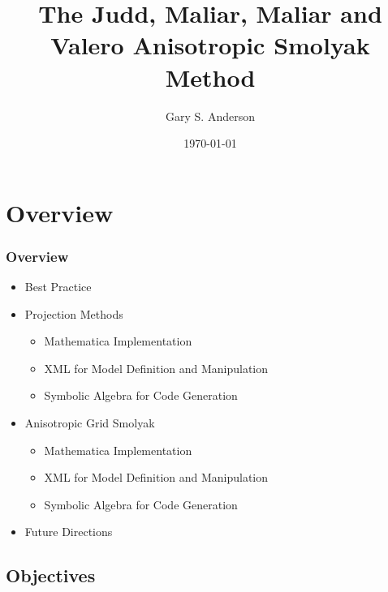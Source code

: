 \documentclass[handout]{beamer}
\begin{document}
\title[The Anisotropic Smolyak Method]{The Judd, Maliar, Maliar and Valero Anisotropic Smolyak Method}


\author{Gary S. Anderson}
\date{\today} 


\frame{\titlepage}


\section{Overview}



\begin{frame}
  \frametitle{Overview}
  
  \begin{itemize}
  \item Best Practice
  \item Projection Methods
    \begin{itemize}
    \item Mathematica Implementation
  \item XML for Model Definition and Manipulation
  \item Symbolic Algebra for Code Generation
    \end{itemize}
  \item Anisotropic Grid Smolyak
    \begin{itemize}
    \item Mathematica Implementation
  \item XML for Model Definition and Manipulation
  \item Symbolic Algebra for Code Generation
    \end{itemize}
  \item Future Directions
  \end{itemize}
\end{frame}


\subsection{Objectives}
\end{document}
